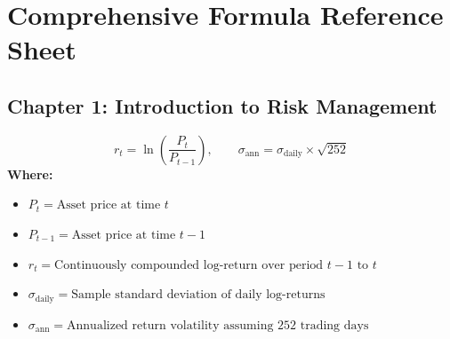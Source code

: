 
\chapter*{Comprehensive Formula Reference Sheet}

\section*{Chapter 1: Introduction to Risk Management}

\begin{formulabox}
\begin{equation}
r_t = \ln\left(\frac{P_t}{P_{t-1}}\right), \qquad \sigma_{\text{ann}} = \sigma_{\text{daily}} \times \sqrt{252}
\end{equation}
\textbf{Where:}
\begin{itemize}[noitemsep, topsep=2pt]
    \item $P_t = \text{Asset price at time } t$
    \item $P_{t-1} = \text{Asset price at time } t-1$
    \item $r_t = \text{Continuously compounded log-return over period } t-1 \text{ to } t$
    \item $\sigma_{\text{daily}} = \text{Sample standard deviation of daily log-returns}$
    \item $\sigma_{\text{ann}} = \text{Annualized return volatility assuming 252 trading days}$
\end{itemize}
\end{formulabox}

